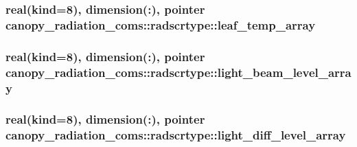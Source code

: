 \subsubsection[{\texorpdfstring{leaf\+\_\+temp\+\_\+array}{leaf_temp_array}}]{\setlength{\rightskip}{0pt plus 5cm}real(kind=8), dimension(\+:), pointer canopy\+\_\+radiation\+\_\+coms\+::radscrtype\+::leaf\+\_\+temp\+\_\+array}\hypertarget{structcanopy__radiation__coms_1_1radscrtype_a57fbfde7080d6a9328c073d3a5eb26f3}{}\label{structcanopy__radiation__coms_1_1radscrtype_a57fbfde7080d6a9328c073d3a5eb26f3}
\subsubsection[{\texorpdfstring{light\+\_\+beam\+\_\+level\+\_\+array}{light_beam_level_array}}]{\setlength{\rightskip}{0pt plus 5cm}real(kind=8), dimension(\+:), pointer canopy\+\_\+radiation\+\_\+coms\+::radscrtype\+::light\+\_\+beam\+\_\+level\+\_\+array}\hypertarget{structcanopy__radiation__coms_1_1radscrtype_a99c53007f3f4118d80d360cb2a364d1c}{}\label{structcanopy__radiation__coms_1_1radscrtype_a99c53007f3f4118d80d360cb2a364d1c}
\subsubsection[{\texorpdfstring{light\+\_\+diff\+\_\+level\+\_\+array}{light_diff_level_array}}]{\setlength{\rightskip}{0pt plus 5cm}real(kind=8), dimension(\+:), pointer canopy\+\_\+radiation\+\_\+coms\+::radscrtype\+::light\+\_\+diff\+\_\+level\+\_\+array}\hypertarget{structcanopy__radiation__coms_1_1radscrtype_a95e470b51c778d8baf24b9875c74d893}{}\label{structcanopy__radiation__coms_1_1radscrtype_a95e470b51c778d8baf24b9875c74d893}
